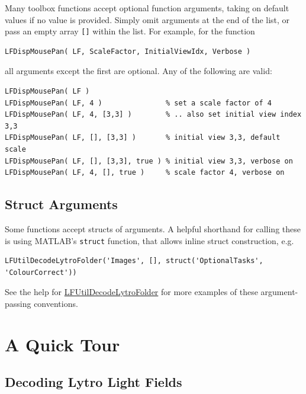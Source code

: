 \documentclass[onecolumn]{article}
\newcommand{\CiteFunction}[1]{\hyperlink{#1}{\small #1}}
\newcommand{\SymbolText}[1]{\texttt{\small #1}}
\begin{document}
Many toolbox functions accept optional function arguments, taking on default values if no value is provided. Simply omit arguments at the end of the list, or pass an empty array \SymbolText{[]} within the list. For example, for the function

\begin{Verbatim}
LFDispMousePan( LF, ScaleFactor, InitialViewIdx, Verbose )
\end{Verbatim}
all arguments except the first are optional. Any of the following are valid:
\begin{Verbatim}
LFDispMousePan( LF ) 
LFDispMousePan( LF, 4 )               % set a scale factor of 4
LFDispMousePan( LF, 4, [3,3] )        % .. also set initial view index 3,3
LFDispMousePan( LF, [], [3,3] )       % initial view 3,3, default scale
LFDispMousePan( LF, [], [3,3], true ) % initial view 3,3, verbose on
LFDispMousePan( LF, 4, [], true )     % scale factor 4, verbose on
\end{Verbatim}

\subsection{Struct Arguments}

Some functions accept structs of arguments. A helpful shorthand for calling these is using MATLAB's \SymbolText{struct} function, that allows inline struct construction, e.g.
\begin{Verbatim}
LFUtilDecodeLytroFolder('Images', [], struct('OptionalTasks', 'ColourCorrect'))
\end{Verbatim}

See the help for \CiteFunction{LFUtilDecodeLytroFolder} for more examples of these argument-passing conventions.


\section{A Quick Tour}
\label{sect_QuickTour}
\subsection{Decoding Lytro Light Fields}
\label{sect_DecodingLytro}
\end{document}
